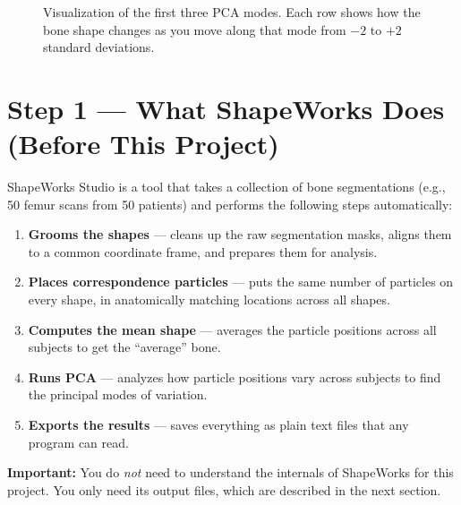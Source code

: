 \documentclass[12pt,a4paper]{article}
\begin{document}
\begin{figure}[H]
    \centering
    \caption{Visualization of the first three PCA modes. Each row shows how the bone shape changes as you move along that mode from $-2$ to $+2$ standard deviations.}
    \label{fig:pca_modes}
\end{figure}

\section{Step 1 --- What ShapeWorks Does (Before This Project)}

ShapeWorks Studio is a tool that takes a collection of bone segmentations (e.g., 50 femur scans from 50 patients) and performs the following steps automatically:

\begin{enumerate}[itemsep=0.5em]
    \item \textbf{Grooms the shapes} --- cleans up the raw segmentation masks, aligns them to a common coordinate frame, and prepares them for analysis.
    \item \textbf{Places correspondence particles} --- puts the same number of particles on every shape, in anatomically matching locations across all shapes.
    \item \textbf{Computes the mean shape} --- averages the particle positions across all subjects to get the ``average'' bone.
    \item \textbf{Runs PCA} --- analyzes how particle positions vary across subjects to find the principal modes of variation.
    \item \textbf{Exports the results} --- saves everything as plain text files that any program can read.
\end{enumerate}

\begin{mdframed}[backgroundcolor=codegray, linecolor=notegreen, linewidth=1.5pt]
\textbf{Important:} You do \emph{not} need to understand the internals of ShapeWorks for this project. You only need its output files, which are described in the next section.
\end{mdframed}
\end{document}
